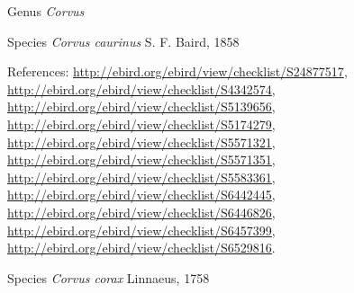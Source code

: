 \documentclass[9pt, article]{memoir}
\begin{document}
\begin{multicols}{2}
\vspace{6pt}\noindent\hspace{30pt}Genus \textit{Corvus}


\vspace{6pt}\noindent\hspace{36pt}Species \textit{Corvus caurinus} S. F. Baird, 1858


\vspace{6pt}References: 
\url{http://ebird.org/ebird/view/checklist/S24877517}, 
\url{http://ebird.org/ebird/view/checklist/S4342574}, 
\url{http://ebird.org/ebird/view/checklist/S5139656}, 
\url{http://ebird.org/ebird/view/checklist/S5174279}, 
\url{http://ebird.org/ebird/view/checklist/S5571321}, 
\url{http://ebird.org/ebird/view/checklist/S5571351}, 
\url{http://ebird.org/ebird/view/checklist/S5583361}, 
\url{http://ebird.org/ebird/view/checklist/S6442445}, 
\url{http://ebird.org/ebird/view/checklist/S6446826}, 
\url{http://ebird.org/ebird/view/checklist/S6457399}, 
\url{http://ebird.org/ebird/view/checklist/S6529816}.

\vspace{6pt}\noindent\hspace{36pt}Species \textit{Corvus corax} Linnaeus, 1758



\end{multicols}
\end{document}
